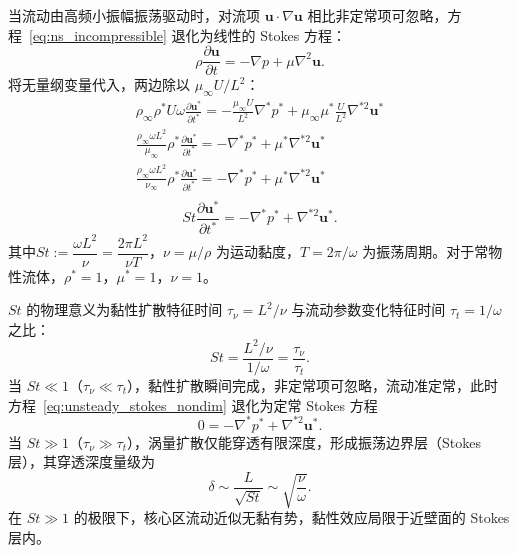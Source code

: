 当流动由高频小振幅振荡驱动时，对流项 $\mathbf{u}\cdot\nabla\mathbf{u}$ 相比非定常项可忽略，方程~\eqref{eq:ns_incompressible} 退化为线性的 Stokes 方程：
\begin{equation}
    \rho \frac{\partial \mathbf{u}}{\partial t} = -\nabla p + \mu \nabla^2 \mathbf{u}.
    \label{eq:stokes}
\end{equation}
将无量纲变量代入，两边除以 $\mu_\infty U/L^2$：
\begin{gather*}
    \rho_\infty \rho^* U \omega \frac{\partial \mathbf{u}^*}{\partial t^*} = -\frac{\mu_\infty U}{L^2} \nabla^* p^*
    +\mu_\infty \mu^* \frac{U}{L^2} \nabla^{*2}\mathbf{u}^*\\
    \frac{\rho_\infty \omega L^2}{\mu_\infty} \rho^* \frac{\partial \mathbf{u}^*}{\partial t^*} = -\nabla^* p^* + \mu^* \nabla^{*2}\mathbf{u}^*\\
        \frac{\rho_\infty \omega L^2}{\nu_\infty} \rho^* \frac{\partial \mathbf{u}^*}{\partial t^*} = -\nabla^* p^* + \mu^* \nabla^{*2}\mathbf{u}^*\\
\end{gather*}
\begin{equation}
    St \frac{\partial \mathbf{u}^*}{\partial t^*} = -\nabla^* p^* + \nabla^{*2}\mathbf{u}^*.
    \label{eq:unsteady_stokes_nondim}
\end{equation}
其中\(St := \dfrac{\omega L^2}{\nu} = \dfrac{2\pi L^2}{\nu T}\)，$\nu = \mu/\rho$ 为运动黏度，$T = 2\pi/\omega$ 为振荡周期。对于常物性流体，$\rho^* = 1$，$\mu^* = 1$，$\nu = 1$。

$St$ 的物理意义为黏性扩散特征时间 $\tau_\nu = L^2/\nu$ 与流动参数变化特征时间 $\tau_t = 1/\omega$ 之比：
\begin{equation}
    St = \frac{L^2/\nu}{1/\omega} = \frac{\tau_\nu}{\tau_t}.
\end{equation}
当 $St \ll 1$（$\tau_\nu \ll \tau_t$），黏性扩散瞬间完成，非定常项可忽略，流动准定常，此时方程~\eqref{eq:unsteady_stokes_nondim} 退化为定常 Stokes 方程
\begin{equation}
    0 = -\nabla^* p^* + \nabla^{*2}\mathbf{u}^*.
\end{equation}
当 $St \gg 1$（$\tau_\nu \gg \tau_t$），涡量扩散仅能穿透有限深度，形成振荡边界层（Stokes 层），其穿透深度量级为
\begin{equation}
    \delta \sim \frac{L}{\sqrt{St}} \sim \sqrt{\frac{\nu}{\omega}}.
\end{equation}
在 $St \gg 1$ 的极限下，核心区流动近似无黏有势，黏性效应局限于近壁面的 Stokes 层内。


